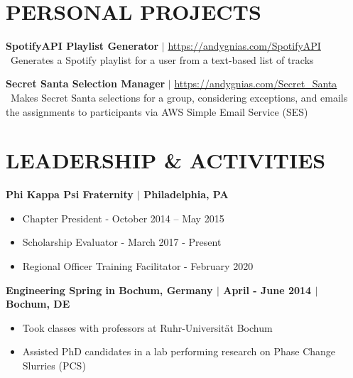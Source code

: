 \documentclass[line,resmargin,11pt]{res}
\begin{document}
\begin{resume}
\section{PERSONAL PROJECTS}

\textbf{SpotifyAPI Playlist Generator} $|$ \url{https://andygnias.com/SpotifyAPI} \\
\textbullet\ Generates a Spotify playlist for a user from a text-based list of tracks

\textbf{Secret Santa Selection Manager} $|$ \url{https://andygnias.com/Secret_Santa} \\
\textbullet\ Makes Secret Santa selections for a group, considering exceptions, and emails the assignments to participants via AWS Simple Email Service (SES)

				
\section{LEADERSHIP \& ACTIVITIES}
				\textbf{Phi Kappa Psi Fraternity $|$ Philadelphia, PA} \\
				\begin{itemize} \itemsep -2pt
				\item  Chapter President - October 2014 – May 2015
				\item Scholarship Evaluator - March 2017 - Present
				\item  Regional Officer Training Facilitator - February 2020
				\end{itemize}
				
				\textbf{Engineering Spring in Bochum, Germany  $|$ April - June 2014 $|$ Bochum, DE} \\
				\begin{itemize} \itemsep -2pt
				\item  Took classes with professors at Ruhr-Universität Bochum
				\item Assisted PhD candidates in a lab performing research on Phase Change Slurries (PCS)
				\end{itemize}

\end{resume}
\end{document}
